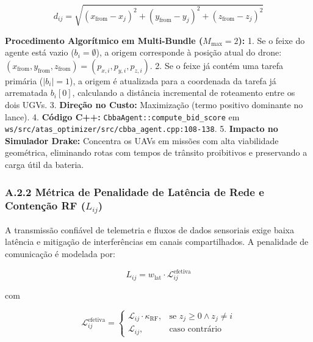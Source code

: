 \documentclass[
  brazilian,
  a4paper]{article}
\begin{document}
\[d_{ij} = \sqrt{(x_{\text{from}} - x_j)^2 + (y_{\text{from}} - y_j)^2 + (z_{\text{from}} - z_j)^2}\]

\textbf{Procedimento Algorítmico em Multi-Bundle
(\(M_{\text{max}} = 2\)):} 1. Se o feixe do agente está vazio
(\(b_i = \emptyset\)), a origem corresponde à posição atual do drone:
\((x_{\text{from}}, y_{\text{from}}, z_{\text{from}}) = (p_{x,i}, p_{y,i}, p_{z,i})\).
2. Se o feixe já contém uma tarefa primária (\(|b_i| = 1\)), a origem é
atualizada para a coordenada da tarefa já arrematada \(b_i[0]\),
calculando a distância incremental de roteamento entre os dois UGVs. 3.
\textbf{Direção no Custo:} Maximização (termo positivo dominante no
lance). 4. \textbf{Código C++:} \texttt{CbbaAgent:\allowbreak{}:\allowbreak{}compute\_\allowbreak{}bid\_\allowbreak{}score}
em \texttt{ws/\allowbreak{}src/\allowbreak{}atas\_\allowbreak{}optimizer/\allowbreak{}src/\allowbreak{}cbba\_\allowbreak{}agent.\allowbreak{}cpp:\allowbreak{}108-138}. 5.
\textbf{Impacto no Simulador Drake:} Concentra os UAVs em missões com
alta viabilidade geométrica, eliminando rotas com tempos de trânsito
proibitivos e preservando a carga útil da bateria.

\subsubsection{\texorpdfstring{A.2.2 Métrica de Penalidade de Latência
de Rede e Contenção RF
(\(L_{ij}\))}{A.2.2 Métrica de Penalidade de Latência de Rede e Contenção RF (L\_\{ij\})}}\label{a.2.2-muxe9trica-de-penalidade-de-latuxeancia-de-rede-e-contenuxe7uxe3o-rf-l_ij}

A transmissão confiável de telemetria e fluxos de dados sensoriais exige
baixa latência e mitigação de interferências em canais compartilhados. A
penalidade de comunicação é modelada por:

\[L_{ij} = w_{\text{lat}} \cdot \mathcal{L}_{ij}^{\text{efetiva}}\]

com

\[\mathcal{L}_{ij}^{\text{efetiva}} = \begin{cases} \mathcal{L}_{ij} \cdot \kappa_{\text{RF}}, & \text{se } z_j \ge 0 \land z_j \ne i \\ \mathcal{L}_{ij}, & \text{caso contrário} \end{cases}\]
\end{document}
